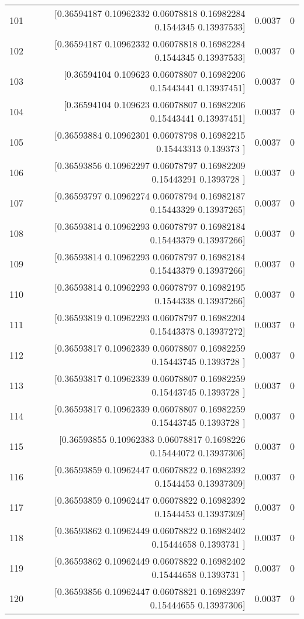 \begin{longtable}{lrrr}
101 & [0.36594187 0.10962332 0.06078818 0.16982284 0.1544345  0.13937533] & 0.0037 & 0 \\
102 & [0.36594187 0.10962332 0.06078818 0.16982284 0.1544345  0.13937533] & 0.0037 & 0 \\
103 & [0.36594104 0.109623   0.06078807 0.16982206 0.15443441 0.13937451] & 0.0037 & 0 \\
104 & [0.36594104 0.109623   0.06078807 0.16982206 0.15443441 0.13937451] & 0.0037 & 0 \\
105 & [0.36593884 0.10962301 0.06078798 0.16982215 0.15443313 0.139373  ] & 0.0037 & 0 \\
106 & [0.36593856 0.10962297 0.06078797 0.16982209 0.15443291 0.1393728 ] & 0.0037 & 0 \\
107 & [0.36593797 0.10962274 0.06078794 0.16982187 0.15443329 0.13937265] & 0.0037 & 0 \\
108 & [0.36593814 0.10962293 0.06078797 0.16982184 0.15443379 0.13937266] & 0.0037 & 0 \\
109 & [0.36593814 0.10962293 0.06078797 0.16982184 0.15443379 0.13937266] & 0.0037 & 0 \\
110 & [0.36593814 0.10962293 0.06078797 0.16982195 0.1544338  0.13937266] & 0.0037 & 0 \\
111 & [0.36593819 0.10962293 0.06078797 0.16982204 0.15443378 0.13937272] & 0.0037 & 0 \\
112 & [0.36593817 0.10962339 0.06078807 0.16982259 0.15443745 0.1393728 ] & 0.0037 & 0 \\
113 & [0.36593817 0.10962339 0.06078807 0.16982259 0.15443745 0.1393728 ] & 0.0037 & 0 \\
114 & [0.36593817 0.10962339 0.06078807 0.16982259 0.15443745 0.1393728 ] & 0.0037 & 0 \\
115 & [0.36593855 0.10962383 0.06078817 0.1698226  0.15444072 0.13937306] & 0.0037 & 0 \\
116 & [0.36593859 0.10962447 0.06078822 0.16982392 0.1544453  0.13937309] & 0.0037 & 0 \\
117 & [0.36593859 0.10962447 0.06078822 0.16982392 0.1544453  0.13937309] & 0.0037 & 0 \\
118 & [0.36593862 0.10962449 0.06078822 0.16982402 0.15444658 0.1393731 ] & 0.0037 & 0 \\
119 & [0.36593862 0.10962449 0.06078822 0.16982402 0.15444658 0.1393731 ] & 0.0037 & 0 \\
120 & [0.36593856 0.10962447 0.06078821 0.16982397 0.15444655 0.13937306] & 0.0037 & 0 \\

\end{longtable}
